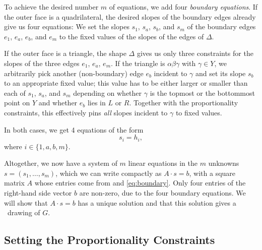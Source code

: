 To achieve the desired number $m$ of equations, we add
four \emph{boundary equations}.  If the outer face is a quadrilateral,
the desired slopes of the boundary edges already give us four equations:
We set
the slopes $s_1$, $s_a$, $s_b$, and $s_m$ of the boundary edges $e_1$, $e_a$,
$e_b$, and $e_m$ to the fixed values of the slopes of the edges of
$\Delta$.

If the outer face is a triangle, the shape $\Delta$ gives us
only three constraints for the slopes of the three edges $e_1$, $e_a$,
$e_m$.  If the triangle is $\alpha\beta\gamma$ with $\gamma\in Y$,
we arbitrarily pick another (non-boundary) edge $e_b$ incident to $\gamma$
and set its slope $s_b$ to an appropriate fixed value; this value has
to be either larger or smaller than each of $s_1$, $s_a$, and $s_m$
depending on whether $\gamma$ is the topmost or the bottommost point
on $Y$ and whether $e_b$ lies in $L$ or $R$. Together with the
proportionality constraints, this effectively pins \emph{all} slopes
incident to $\gamma$ to fixed values.

In both cases, we get 4 equations of the form
\begin{equation}
  \label{eq:boundary}
  s_i = h_i, %
\end{equation}
where $i\in\{1,a,b,m\}$.


Altogether, we now have a system of $m$ linear equations
in the $m$ unknowns $s=(s_1,\ldots,s_m)$, which we can write
compactly as
$A\cdot s = b$, with a square matrix $A$ whose entries come from
\thetag{\ref{eq:slope0}--\ref{eq:proportion2}}
and \eqref{eq:boundary}.
Only four entries of
the right-hand side vector
$b$
are non-zero, due to the four boundary equations.
We will show that $A\cdot s=b$ has a unique
solution and that this solution gives a \Fary\ drawing of $G$.

\subsection{Setting the Proportionality Constraints}
\label{sec:setting}


